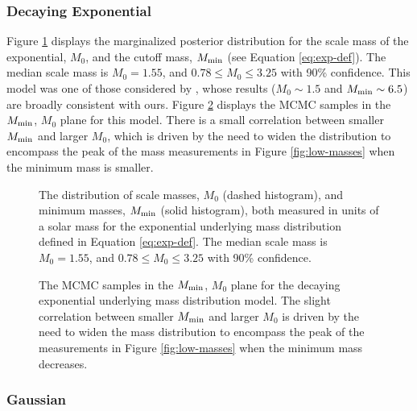 \documentclass[preprint]{aastex}
\newcommand{\Mmin}{M_{\textnormal{min}}}
\begin{document}
\subsubsection{Decaying Exponential}

Figure \ref{fig:exp-marginal} displays the marginalized posterior
distribution for the scale mass of the exponential, $M_0$, and the
cutoff mass, $\Mmin$ (see Equation \ref{eq:exp-def}).  The median
scale mass is $M_0 = 1.55$, and $0.78 \leq M_0 \leq 3.25$ with 90\%
confidence.  This model was one of those considered by
\citet{Ozel2010}, whose results ($M_0 \sim 1.5$ and $\Mmin \sim 6.5$)
are broadly consistent with ours.  Figure \ref{fig:exp-2D} displays
the MCMC samples in the $\Mmin$, $M_0$ plane for this model.  There is
a small correlation between smaller $\Mmin$ and larger $M_0$, which is
driven by the need to widen the distribution to encompass the peak of
the mass measurements in Figure \ref{fig:low-masses} when the minimum
mass is smaller.

\begin{figure}
  \begin{center}
  \end{center}
  \caption{\label{fig:exp-marginal} The distribution of scale masses,
    $M_0$ (dashed histogram), and minimum masses, $\Mmin$ (solid
    histogram), both measured in units of a solar mass for the
    exponential underlying mass distribution defined in Equation
    \eqref{eq:exp-def}.  The median scale mass is $M_0 = 1.55$, and
    $0.78 \leq M_0 \leq 3.25$ with 90\% confidence.}
\end{figure}

\begin{figure}
  \begin{center}
  \end{center}
  \caption{\label{fig:exp-2D} The MCMC samples in the $\Mmin$, $M_0$
    plane for the decaying exponential underlying mass distribution
    model.  The slight correlation between smaller $\Mmin$ and larger
    $M_0$ is driven by the need to widen the mass distribution to
    encompass the peak of the measurements in Figure
    \ref{fig:low-masses} when the minimum mass decreases.}
\end{figure}

\subsubsection{Gaussian}
\end{document}
